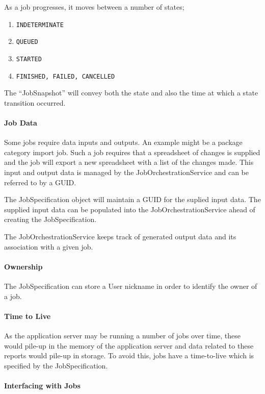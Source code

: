 As a job progresses, it moves between a number of states;

\begin{enumerate}
\item {\tt INDETERMINATE}
\item {\tt QUEUED}
\item {\tt STARTED}
\item {\tt FINISHED, FAILED, CANCELLED}
\end{enumerate}

The ``JobSnapshot'' will convey both the state and also the time at which a state transition occurred.

\paragraph{Job Data}

Some jobs require data inputs and outputs.  An example might be a package category import job.  Such a job requires that a spreadsheet of changes is supplied and the job will export a new spreadsheet with a list of the changes made.  This input and output data is managed by the JobOrchestrationService and can be referred to by a GUID.

 The JobSpecification object will maintain a GUID for the suplied input data.  The supplied input data can be populated into the JobOrchestrationService ahead of creating the JobSpecification.

 The JobOrchestrationService keeps track of generated output data and its association with a given job.

\paragraph{Ownership}

The JobSpecification can store a User nickname in order to identify the owner of a job.

\paragraph{Time to Live}

As the application server may be running a number of jobs over time, these would pile-up in the memory of the application server and data related to these reports would pile-up in storage.  To avoid this, jobs have a time-to-live which is specified by the JobSpecification.

\paragraph{Interfacing with Jobs}

